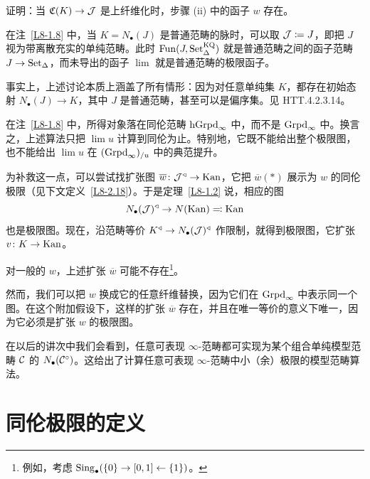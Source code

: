 \begin{exercise}\label{L8-1.9}
证明：当 $\mathfrak{C}(K)\to \mathcal{J}$ 是上纤维化时，步骤 (ii) 中的函子 $w$ 存在。
\end{exercise}

\begin{remark}\label{L8-1.10}
在注~\ref{L8-1.8} 中，当 $K=N_\bullet(J)$ 是普通范畴的脉时，可以取 $\mathcal{J}\coloneqq J$，即把 $J$ 视为带离散充实的单纯范畴。此时 $\operatorname{Fun}(J,\operatorname{Set}^{\mathrm{KQ}}_\Delta)$ 就是普通范畴之间的函子范畴 $J\to\operatorname{Set}_\Delta$，而未导出的函子 $\lim$ 就是普通范畴的极限函子。

事实上，上述讨论本质上涵盖了所有情形：因为对任意单纯集 $K$，都存在初始态射 $N_\bullet(J)\to K$，其中 $J$ 是普通范畴，甚至可以是偏序集。见 HTT.4.2.3.14。
\end{remark}

\begin{remark}\label{L8-1.11}
在注~\ref{L8-1.8} 中，所得对象落在同伦范畴 $\operatorname{hGrpd}_\infty$ 中，而不是 $\operatorname{Grpd}_\infty$ 中。换言之，上述算法只把 $\lim u$ 计算到同伦为止。特别地，它既不能给出整个极限图，也不能给出 $\lim u$ 在 $(\operatorname{Grpd}_\infty)_{/u}$ 中的典范提升。

为补救这一点，可以尝试找扩张图 $\overline{w}\colon \mathcal{J}^{\triangleleft}\to \operatorname{Kan}$，它把 $\overline{w}(\ast)$ 展示为 $w$ 的同伦极限（见下文定义~\ref{L8-2.18}）。于是定理~\ref{L8-1.2} 说，相应的图
\[
N_\bullet(\mathcal{J})^{\triangleleft}\to N(\operatorname{Kan})\eqqcolon \operatorname{Kan}
\]
也是极限图。现在，沿范畴等价 $K^{\triangleleft}\to N_\bullet(\mathcal{J})^{\triangleleft}$ 作限制，就得到极限图，它扩张 $v\colon K\to\operatorname{Kan}$。

对一般的 $w$，上述扩张 $\overline{w}$ 可能不存在\footnote{例如，考虑 $\operatorname{Sing}_\bullet(\{0\}\to[0,1]\leftarrow\{1\})$。}。

然而，我们可以把 $w$ 换成它的任意纤维替换，因为它们在 $\operatorname{Grpd}_\infty$ 中表示同一个图。在这个附加假设下，这样的扩张 $\overline{w}$ 存在，并且在唯一等价的意义下唯一，因为它必须是扩张 $w$ 的极限图。
\end{remark}

\begin{remark}\label{L8-1.12}
在以后的讲次中我们会看到，任意可表现 $\infty$-范畴都可实现为某个组合单纯模型范畴 $\mathcal{C}$ 的 $N_\bullet(\mathcal{C}^{\circ})$。这给出了计算任意可表现 $\infty$-范畴中小（余）极限的模型范畴算法。
\end{remark}

\section{同伦极限的定义}


